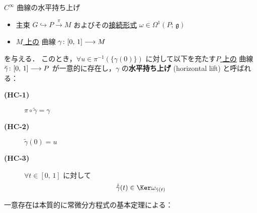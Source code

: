\documentclass[TQFT_main]{subfiles}
\begin{document}
\begin{mydef}[label=def:horizontal-lift-curve]{$C^\infty$ 曲線の水平持ち上げ}
    \begin{itemize}
        \item 主束 $G \hookrightarrow P \xrightarrow{\pi} M$ およびその\hyperref[def:connection]{接続形式} $\omega \in \Omega^1(P;\, \mathfrak{g})$
        \item \underline{$M$ 上の} \cinfty 曲線 $\gamma \colon [0,\, 1] \longrightarrow M$
    \end{itemize}
    を与える．
    このとき，$\forall u \in \pi^{-1}(\{\gamma(0)\})$ に対して以下を充たす\underline{$P$ 上の} \cinfty 曲線 $\tilde{\gamma} \colon [0,\, 1] \longrightarrow P$ が一意的に存在し，$\gamma$ の\textbf{水平持ち上げ} (horizontal lift) と呼ばれる：
    \begin{description}
        \item[\textbf{(HC-1)}] $\pi \circ \tilde{\gamma} = \gamma$
        \item[\textbf{(HC-2)}] $\tilde{\gamma}(0) = u$
        \item[\textbf{(HC-3)}] $\forall t \in [0,\, 1]$ に対して
        \begin{align}
            \dot{\tilde{\gamma}}(t) \in \Ker \omega_{\tilde{\gamma}(t)}
        \end{align}
    \end{description}
\end{mydef}


一意存在は本質的に常微分方程式の基本定理による：
\end{document}
